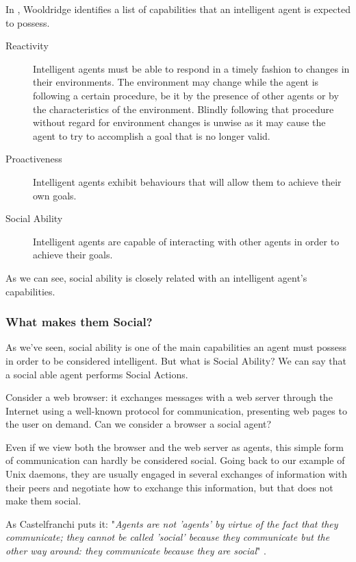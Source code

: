 In \cite{wooldridge:multiagent-systems}, Wooldridge identifies a list of capabilities that an intelligent agent is expected to possess.

\begin{description}
	\item[Reactivity] Intelligent agents must be able to respond in a timely fashion to changes in their environments.
	The environment may change while the agent is following a certain procedure, be it by the presence of other agents or by the characteristics of the environment.
	Blindly following that procedure without regard for environment changes is unwise as it may cause the agent to try to accomplish a goal that is no longer valid.
	\item[Proactiveness] Intelligent agents exhibit behaviours that will allow them to achieve their own goals. 
	\item[Social Ability] Intelligent agents are capable of interacting with other agents in order to achieve their goals.
\end{description}

As we can see, social ability is closely related with an intelligent agent's capabilities.

\subsubsection{What makes them Social?}
As we've seen, social ability is one of the main capabilities an agent must possess in order to be considered intelligent.
But what is Social Ability?
We can say that a social able agent performs Social Actions.

Consider a web browser: it exchanges messages with a web server through the Internet using a well-known protocol for communication, presenting web pages to the user on demand.
Can we consider a browser a social agent?

Even if we view both the browser and the web server as agents, this simple form of communication can hardly be considered social.
Going back to our example of Unix daemons, they are usually engaged in several exchanges of information with their peers and negotiate how to exchange this information, but that does not make them social.

As Castelfranchi puts it: "\textit{Agents are not 'agents' by virtue of the fact that they communicate;
they cannot be called 'social' because they communicate but the other way around: they communicate because they are social}" \cite{castelfranchi:socialactions}.

